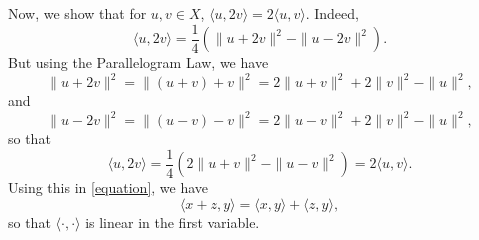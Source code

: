 \documentclass[11pt]{article}
\theoremstyle{thmstyle}
\theoremstyle{defstyle}
\begin{document}
Now, we show that for $u, v\in X$, $\langle u, 2v\rangle = 2\langle u, v\rangle$. Indeed, 
\begin{equation*}
    \langle u, 2v\rangle = \frac{1}{4}\left(\|u + 2v\|^2 - \|u - 2v\|^2\right).
\end{equation*}
But using the Parallelogram Law, we have 
\begin{equation*}
    \|u + 2v\|^2 = \|(u + v) + v\|^2 = 2\|u + v\|^2 + 2\|v\|^2 - \|u\|^2,
\end{equation*}
and 
\begin{equation*}
    \|u - 2v\|^2 = \|(u - v) - v\|^2 = 2\|u - v\|^2 + 2\|v\|^2 - \|u\|^2,
\end{equation*}
so that 
\begin{equation*}
    \langle u, 2v\rangle = \frac{1}{4}\left(2\|u + v\|^2 - \|u - v\|^2\right) = 2\langle u, v\rangle.
\end{equation*}
Using this in \eqref{equation}, we have 
\begin{equation*}
    \langle x + z, y\rangle = \langle x, y\rangle + \langle z, y\rangle,
\end{equation*}
so that $\langle\cdot,\cdot\rangle$ is linear in the first variable. 
\end{document}

